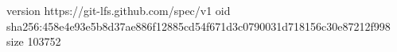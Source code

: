 version https://git-lfs.github.com/spec/v1
oid sha256:458e4e93e5b8d37ae886f12885cd54f671d3c0790031d718156c30e87212f998
size 103752
